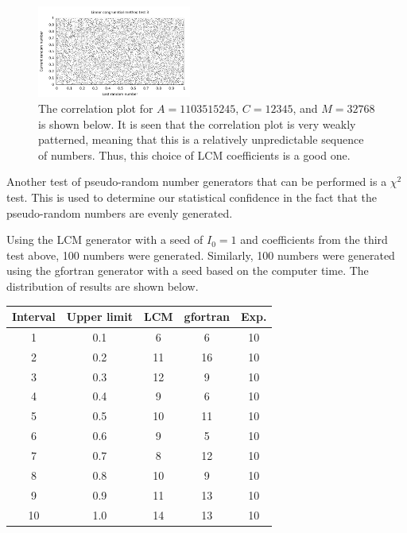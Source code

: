 \documentclass[twocolumn]{myarticle}
\begin{document}
\begin{figure}[ht!]
    \begin{center}
    \includegraphics[width = 0.45\textwidth]{../Plots/LCM_test_3.pdf}
    \caption{%
        The correlation plot for $ A = 1103515245 $, $ C = 12345 $, and $ M = 32768 $ is shown below.
        It is seen that the correlation plot is very weakly patterned, meaning that this is a relatively unpredictable sequence of numbers.
        Thus, this choice of LCM coefficients is a good one.
    }
    \label{fig:LCM_test_3}
    \end{center}
\end{figure}

Another test of pseudo-random number generators that can be performed is a $ \chi^2 $ test.
This is used to determine our statistical confidence in the fact that the pseudo-random numbers are evenly generated.

Using the LCM generator with a seed of $ I_0 = 1 $ and coefficients from the third test above, 100 numbers were generated.
Similarly, 100 numbers were generated using the gfortran generator with a seed based on the computer time.
The distribution of results are shown below.

\bigskip
\begin{center}
    \begin{tabular}{ccccc}
        \toprule
        Interval & Upper limit & LCM & gfortran & Exp. \\
        \midrule
        1  & 0.1 &  6 &  6 & 10 \\
        2  & 0.2 & 11 & 16 & 10 \\
        3  & 0.3 & 12 &  9 & 10 \\
        4  & 0.4 &  9 &  6 & 10 \\
        5  & 0.5 & 10 & 11 & 10 \\
        6  & 0.6 &  9 &  5 & 10 \\
        7  & 0.7 &  8 & 12 & 10 \\
        8  & 0.8 & 10 &  9 & 10 \\
        9  & 0.9 & 11 & 13 & 10 \\
        10 & 1.0 & 14 & 13 & 10 \\
        \bottomrule
    \end{tabular}
\end{center}
\bigskip
\end{document}
